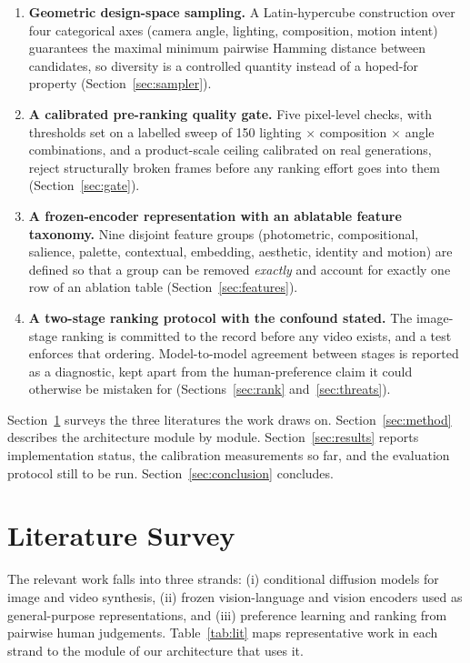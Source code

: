 \documentclass[conference]{IEEEtran}
\begin{document}
\begin{enumerate}
\item \textbf{Geometric design-space sampling.} A Latin-hypercube construction over
four categorical axes (camera angle, lighting, composition, motion intent)
guarantees the maximal minimum pairwise Hamming distance between candidates, so
diversity is a controlled quantity instead of a hoped-for property
(Section~\ref{sec:sampler}).
\item \textbf{A calibrated pre-ranking quality gate.} Five pixel-level checks, with
thresholds set on a labelled sweep of 150 lighting $\times$ composition $\times$
angle combinations, and a product-scale ceiling calibrated on real generations,
reject structurally broken frames before any ranking effort goes into them
(Section~\ref{sec:gate}).
\item \textbf{A frozen-encoder representation with an ablatable feature taxonomy.}
Nine disjoint feature groups (photometric, compositional, salience, palette,
contextual, embedding, aesthetic, identity and motion) are defined so that a group
can be removed \emph{exactly} and account for exactly one row of an ablation table
(Section~\ref{sec:features}).
\item \textbf{A two-stage ranking protocol with the confound stated.} The
image-stage ranking is committed to the record before any video exists, and a test
enforces that ordering. Model-to-model agreement between stages is reported as a
diagnostic, kept apart from the human-preference claim it could otherwise be
mistaken for (Sections~\ref{sec:rank} and~\ref{sec:threats}).
\end{enumerate}

Section~\ref{sec:lit} surveys the three literatures the work draws on.
Section~\ref{sec:method} describes the architecture module by module.
Section~\ref{sec:results} reports implementation status, the calibration
measurements so far, and the evaluation protocol still to be run.
Section~\ref{sec:conclusion} concludes.

\section{Literature Survey}
\label{sec:lit}

The relevant work falls into three strands: (i) conditional diffusion models for
image and video synthesis, (ii) frozen vision-language and vision encoders used as
general-purpose representations, and (iii) preference learning and ranking from
pairwise human judgements. Table~\ref{tab:lit} maps representative work in each
strand to the module of our architecture that uses it.
\end{document}

